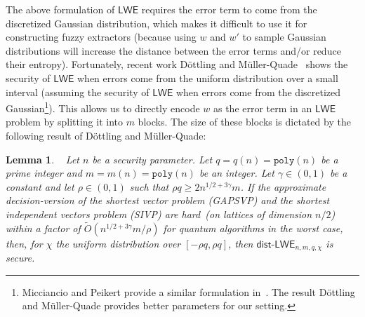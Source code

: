 \documentclass[11pt]{article}
\newcommand{\class}[1]{{\ensuremath{\mathsf{#1}}}}
\newcommand{\rep}{\ensuremath{\class{Rep}}\xspace}
\newcommand{\vect}[1]{\ensuremath{\textbf{#1}}}
\newcommand{\poly}{\ensuremath{\mathtt{poly}}\xspace}
\newcommand{\LWE}{\class{LWE}}
\newcommand{\distLWE}{\ensuremath{\class{dist\mbox{-}LWE}}}
\newtheorem{lemma}[theorem]{Lemma}
\newcommand{\vA}{\vect{A}}
\begin{document}
The above formulation of $\LWE$ requires the error term to come from the discretized Gaussian distribution, which makes it difficult to use it for constructing fuzzy extractors (because using $w$ and $w'$ to sample Gaussian distributions will increase the distance between the error terms and/or reduce their entropy).
Fortunately, recent work D\"{o}ttling and M\"{u}ller-Quade~\cite{dottling2012} shows the security of $\LWE$ when errors come from the uniform distribution over a small interval (assuming the security of $\LWE$ when errors come from the discretized Gaussian\footnote{Micciancio and Peikert provide a similar formulation in~\cite{micciancio2013hardness}.  The result D\"{o}ttling and M\"{u}ller-Quade provides better parameters for our setting.}).  This allows us to directly encode $w$ as the error term in an $\LWE$ problem by splitting it  into $m$ blocks.  The size of these blocks is dictated by the following result of D\"{o}ttling and M\"{u}ller-Quade:

\begin{lemma}~
\label{lem:uniform LWE decision}
Let $n$ be a security parameter.  Let $q = q(n) = \poly(n)$ be a prime integer and $m = m(n) = \poly(n)$ be an integer. Let $\gamma\in (0, 1)$ be a constant and let $\rho\in (0,1)$ such that $\rho q \geq 2n^{1/2+3\gamma}m$. If the approximate decision-version of the shortest vector problem (GAPSVP) and the shortest independent vectors problem (SIVP) are hard~(on lattices of dimension $n/2$) within a factor of $\tilde{O}(n^{1/2+3\gamma}m/\rho)$ for quantum algorithms in the worst case, then, for $\chi$ the uniform distribution over $[-\rho q, \rho q]$, then $\distLWE_{n, m, q, \chi}$ is secure.
\end{lemma}
\end{document}
